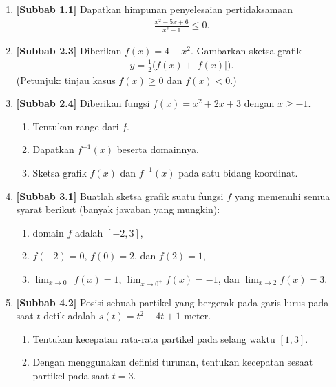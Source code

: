 \documentclass[10pt,openany,a4paper]{article}
\theoremstyle{definition}
\theoremstyle{definition}
\theoremstyle{plain}
\begin{document}
\begin{enumerate}
    \item \textbf{[Subbab 1.1]} Dapatkan himpunan penyelesaian pertidaksamaan
    \begin{align*}
        \frac{x^2-5x+6}{x^2-1}\leq 0.
    \end{align*}

    \item \textbf{[Subbab 2.3]} Diberikan $f(x)=4-x^2$. Gambarkan sketsa grafik
    \begin{align*}
        y=\frac{1}{2}\big(f(x)+|f(x)|\big).
    \end{align*}
    (Petunjuk: tinjau kasus $f(x)\geq 0$ dan $f(x)<0$.)

    \item \textbf{[Subbab 2.4]} Diberikan fungsi $f(x)=x^2+2x+3$ dengan $x\geq -1$.
    \begin{enumerate}
        \item Tentukan range dari $f$.
        \item Dapatkan $f^{-1}(x)$ beserta domainnya.
        \item Sketsa grafik $f(x)$ dan $f^{-1}(x)$ pada satu bidang koordinat.
    \end{enumerate}

    \item \textbf{[Subbab 3.1]} Buatlah sketsa grafik suatu fungsi $f$ yang memenuhi semua syarat berikut (banyak jawaban yang mungkin):
    \begin{enumerate}
        \item domain $f$ adalah $[-2,3]$,
        \item $f(-2)=0$, $f(0)=2$, dan $f(2)=1$,
        \item $\displaystyle\lim_{x\to 0^-}f(x)=1$, $\displaystyle\lim_{x\to 0^+}f(x)=-1$, dan $\displaystyle\lim_{x\to 2}f(x)=3$.
    \end{enumerate}

    \item \textbf{[Subbab 4.2]} Posisi sebuah partikel yang bergerak pada garis lurus pada saat $t$ detik adalah $s(t)=t^2-4t+1$ meter.
    \begin{enumerate}
        \item Tentukan kecepatan rata-rata partikel pada selang waktu $[1,3]$.
        \item Dengan menggunakan definisi turunan, tentukan kecepatan sesaat partikel pada saat $t=3$.
    \end{enumerate}
\end{enumerate}
\end{document}
